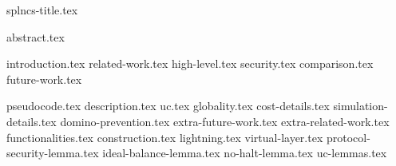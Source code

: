 \documentclass{llncs}
\begin{document}
\pagestyle{plain}
{splncs-title.tex}
\maketitle
{abstract.tex}



{introduction.tex}
{related-work.tex}
{high-level.tex}
%
{security.tex}
{comparison.tex}
{future-work.tex}
%

\makeatletter%
%
  {\appendices}%
  {\appendix}%
\makeatother%
{pseudocode.tex}
%
{description.tex}
{uc.tex}
{globality.tex}
{cost-details.tex}
{simulation-details.tex}
{domino-prevention.tex}
{extra-future-work.tex}
%
{extra-related-work.tex}
{functionalities.tex}
{construction.tex}
{lightning.tex}
{virtual-layer.tex}
{protocol-security-lemma.tex}
{ideal-balance-lemma.tex}
{no-halt-lemma.tex}
{uc-lemmas.tex}
\end{document}

